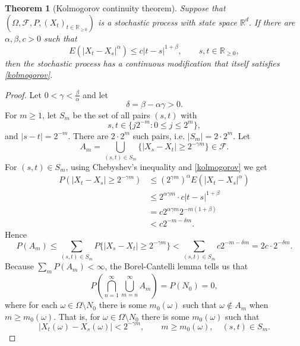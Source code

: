 \documentclass{article}
\newtheorem{theorem}{Theorem}
\theoremstyle{definition}
\begin{document}
\begin{theorem}[Kolmogorov continuity theorem]
Suppose that $(\Omega,\mathscr{F},P,(X_t)_{t \in \mathbb{R}_{\geq 0}})$ is a stochastic process with state space
$\mathbb{R}^d$. If there are $\alpha,\beta,c>0$ such that 
\begin{equation}
E(|X_t-X_s|^\alpha) \leq c | t-s|^{1+\beta}, \qquad s,t \in \mathbb{R}_{\geq 0},
\label{kolmogorov}
\end{equation}
then the stochastic process has a continuous modification that itself satisfies \eqref{kolmogorov}.
\end{theorem}
\begin{proof}
Let $0<\gamma<\frac{\beta}{\alpha}$ and let
\[
\delta = \beta - \alpha \gamma > 0.
\]
For $m \geq 1$, let $S_m$ be the set of all pairs $(s,t)$ with
\[
s,t \in 
\{j2^{-m}: 0 \leq j \leq 2^m\},
\]
and $|s-t|=2^{-m}$. There are $2\cdot 2^m$ such pairs, i.e. $|S_m|=2\cdot 2^m$. 
Let
\[
A_m = \bigcup_{(s,t) \in S_m} \{|X_s-X_t| \geq 2^{-\gamma m}\} \in \mathscr{F}.
\]
For $(s,t) \in S_m$,
using Chebyshev's inequality and \eqref{kolmogorov} we get
\begin{align*}
P(|X_t-X_s| \geq 2^{-\gamma m})&\leq (2^{\gamma m})^\alpha E(|X_t-X_s|^\alpha)\\
&\leq 2^{\alpha \gamma m} \cdot c|t-s|^{1+\beta}\\
&= c2^{\alpha \gamma m} 2^{-m(1+\beta)}\\
&< c2^{-m-\delta m}.
\end{align*}
Hence
\[
P(A_m) \leq \sum_{(s,t) \in S_m} P \{|X_s-X_t| \geq 2^{-\gamma m}\}
<\sum_{(s,t) \in S_m} c 2^{-m-\delta m}
=2c\cdot 2^{-\delta m}.
\]
Because $\sum_m P(A_m)<\infty$, the Borel-Cantelli lemma tells us that
\[
P\left(\bigcap_{n=1}^\infty \bigcup_{m=n}^\infty A_m \right)=P(N_0)=0,
\]
where for  each $\omega \in \Omega \setminus N_0$ there is some $m_0(\omega)$ such that
$\omega \not \in A_m$ when $m \geq m_0(\omega)$. That is,
for $\omega \in \Omega \setminus N_0$ 
there is some $m_0(\omega)$ such that  
\begin{equation}
|X_t(\omega)-X_s(\omega)| < 2^{-\gamma m},
\qquad m \geq m_0(\omega), \quad (s,t) \in S_m.
\label{393}
\end{equation}


\end{proof}
\end{document}
